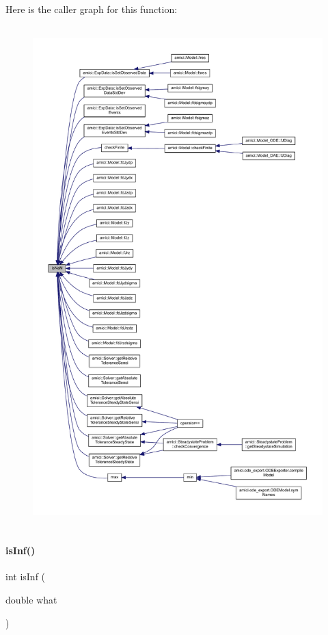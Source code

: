 Here is the caller graph for this function\+:
\nopagebreak
\begin{figure}[H]
\begin{center}
\leavevmode
\includegraphics[height=550pt]{namespaceamici_a7452657cd5f8d541f9e823df5e82c516_icgraph}
\end{center}
\end{figure}
\mbox{\label{namespaceamici_a10c0a2eb43575a155a34f5bb280f7973}} 
\paragraph{\texorpdfstring{is\+Inf()}{isInf()}}
{\footnotesize\ttfamily int is\+Inf (\begin{DoxyParamCaption}\item[{double}]{what }\end{DoxyParamCaption})}


